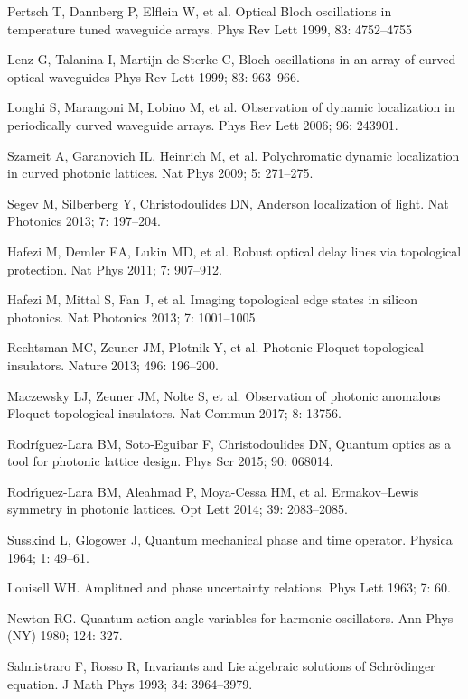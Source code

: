 \documentclass[12pt]{iopart}
\begin{document}
\begin{thebibliography}{100}
	 Pertsch T, Dannberg P, Elflein W, et al.
	Optical Bloch oscillations in temperature tuned waveguide arrays.
	Phys Rev Lett 1999, 83: 4752--4755
	
	 Lenz G, Talanina I, Martijn de Sterke C,
	Bloch oscillations in an array of curved optical waveguides
	Phys Rev Lett 1999;  83: 963--966.
	
	 Longhi S, Marangoni M, Lobino M, et al.
	Observation of dynamic localization in periodically curved waveguide arrays.
	Phys Rev Lett 2006;  96: 243901.
	
	 Szameit A, Garanovich IL, Heinrich M, et al.
	Polychromatic dynamic localization in curved photonic lattices.
	Nat Phys 2009;   5: 271--275.
	
	 Segev M, Silberberg Y, Christodoulides DN,
	Anderson localization of light.
	Nat  Photonics 2013;  7: 197--204.
	
	 Hafezi M, Demler EA, Lukin MD, et al.
	Robust optical delay lines via topological protection.
	Nat  Phys 2011;  7: 907--912.
	
	 Hafezi M, Mittal S, Fan J, et al.
	Imaging topological edge states in silicon photonics.
	Nat Photonics 2013;  7: 1001--1005.
	
	 Rechtsman MC, Zeuner JM, Plotnik Y, et al.
	Photonic Floquet topological insulators.
	Nature 2013;  496: 196--200.
	
	  Maczewsky LJ, Zeuner JM, Nolte S, et al.
	Observation of photonic anomalous Floquet topological insulators.
	Nat Commun  2017;  8: 13756.
	
	 Rodr\'iguez-Lara BM, Soto-Eguibar F, Christodoulides DN,
	Quantum optics as a tool for photonic lattice design.
	Phys Scr 2015;  90: 068014.
	
	  Rodr\'{\i}guez-Lara BM, Aleahmad P, Moya-Cessa HM, et al.
	Ermakov--Lewis symmetry in photonic lattices.
	Opt Lett 2014;  39: 2083--2085.

	 Susskind L, Glogower J,
	Quantum mechanical phase and time operator.
	Physica 1964;  1: 49--61.
	
	 Louisell WH. Amplitued and phase uncertainty relations. Phys Lett 1963; 7: 60.
	
	 Newton RG. Quantum action-angle variables for harmonic oscillators. Ann Phys (NY) 1980; 124: 327. 
	
	
	 Salmistraro F, Rosso R,
	Invariants and Lie algebraic solutions of Schr\"odinger equation.
	J Math Phys 1993;  34: 3964--3979.
	

\end{thebibliography}
\end{document}
